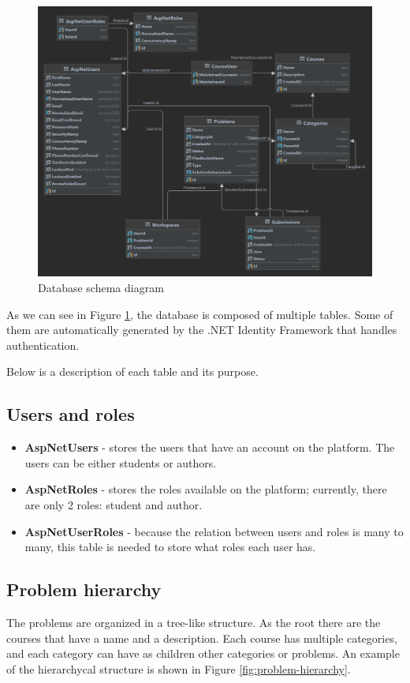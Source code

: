 \documentclass[12pt,a4paper]{report}
\begin{document}
\begin{figure}[h]
	\centering
	\includegraphics[width=\linewidth]{pics/database-schema.png}
	\caption{Database schema diagram}
	\label{fig:database-schema}
\end{figure}

As we can see in Figure \ref{fig:database-schema}, the database is composed of multiple tables. Some of them are automatically generated by the .NET Identity Framework that handles authentication.

Below is a description of each table and its purpose.

\newpage
\subsection{Users and roles}
\label{users-and-roles}
\begin{itemize}
	\item \textbf{AspNetUsers} - stores the users that have an account on the platform. The users can be either students or authors.
	\item \textbf{AspNetRoles} - stores the roles available on the platform; currently, there are only 2 roles: student and author.
	\item \textbf{AspNetUserRoles} - because the relation between users and roles is many to many, this table is needed to store what roles each user has.
\end{itemize}

\subsection{Problem hierarchy}
The problems are organized in a tree-like structure. As the root there are the courses that have a name and a description. Each course has multiple categories, and each category can have as children other categories or problems. An example of the hierarchycal structure is shown in Figure \ref{fig:problem-hierarchy}.
\end{document}

